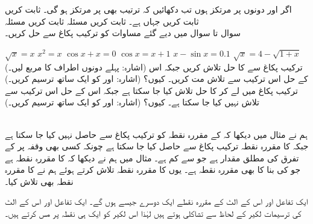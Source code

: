 اگر  اور  دونوں  پر مرتکز ہوں تب دکھائیں کہ ترتیب  بھی  پر مرتکز ہو گی۔
ثابت کریں 
ثابت کریں  جہاں  ہے۔
ثابت کریں مسئلہ 
ثابت کریں مسئلہ 
\\
سوال  تا سوال  میں دیے گئے مساوات کو ترکیب پکاغ سے حل کریں۔

$\sqrt{x}=x$
$x^2=x$
$\cos x+x=0$
$\cos x=x+1$
$x-\sin x=0.1$
$\sqrt{x}=4-\sqrt{1+x}$\quad
(اشارہ: پہلے دونوں اطراف کا مربع لیں۔)
ترکیب پکاغ سے  کا حل  تلاش کریں جبکہ اس کے حل  اس ترکیب سے تلاش مت کریں۔ کیوں؟ (اشارہ:  اور  کو ایک ساتھ ترسیم کریں۔)
ترکیب پکاغ میں  لے کر  کا حل   تلاش کیا جا سکتا ہے جبکہ اس کے حل  اس ترکیب سے تلاش نہیں کیا جا سکتا ہے۔ کیوں؟ (اشارہ:  اور  کو ایک ساتھ ترسیم کریں۔)

\\
ہم نے مثال  میں دیکھا کہ  کے مقررہ نقطہ کو ترکیب پکاغ سے حاصل نہیں کیا جا سکتا ہے جبکہ   کا مقررہ نقطہ ترکیب پکاغ سے حاصل کیا جا سکتا ہے چونکہ کسی بھی وقفہ پر  کے تفرق  کی مطلق مقدار  ہے جو  سے کم ہے۔ مثال  میں ہم نے دیکھا کہ  کا مقررہ نقطہ  ہے  جو  کی بنا  کا بھی مقررہ نقطہ ہے۔ یوں  کا مقررہ نقطہ تلاش کرتے ہوئے ہم نے  کا مقررہ نقطہ بھی تلاش کیا۔

ایک تفاعل اور اس کے الٹ کے مقررہ نقطے ایک دوسرے جیسے ہوں گے۔ ایک تفاعل اور اس کے الٹ کی ترسیمات لکیر  کے لحاظ سے تشاکلی ہوتے ہیں لہٰذا اس لکیر کو ایک ہی نقطہ پر مس کرتے ہیں۔

